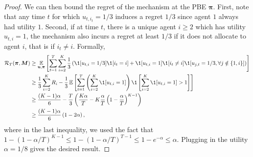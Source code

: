 \begin{proof}
    We can then bound the regret of the mechanism at the PBE $\bm\pi$. First, note that any time $t$ for which $u_{t,i_t}=1/3$ induces a regret $1/3$ since agent $1$ always had utility $1$. Second, if at time $t$, there is a unique agent $i\geq 2$ which has utility $u_{t,i}=1$, the mechanism also incurs a regret at least $1/3$ if it does not allocate to agent $i$, that is if $i_t\neq i$. Formally,
    \begin{align*}
        \mathcal R_T(\bm \pi,\bm M) &\geq \E_{\bm u,\bm\pi}\sqb{\sum_{t=1}^T \sum_{i=2}^K\frac{1}{3}\paren{\1[u_{t,i}=1/3]\1[i_t=i]  + \1[u_{t,i}=1]\1[i_t\neq i]\1[u_{j,t}=1/3,\forall j\notin\{1,i\}]} }\\
        &\geq \frac{1}{3}\sum_{i=2}^K R_i - \frac{1}{3}\E\sqb{\sum_{t=1}^T \paren{\sum_{i=2}^K\1[u_{t,i}=1]}\1\sqb{\sum_{i=2}^K\1[u_{t,i}=1] >1}}\\
        &\geq \frac{(K-1)\alpha}{6} - \frac{T}{3}\paren{\frac{K\alpha}{T}-K\frac{\alpha}{T}\paren{1-\frac{\alpha}{T}}^{K-1}}\\
        &\geq \frac{(K-1)\alpha}{6}\paren{1-2\alpha},
    \end{align*}
    where in the last inequality, we used the fact that $1-(1-\alpha/T)^{K-1}\leq 1- (1-\alpha/T)^{T-1} \leq 1-e^{-\alpha}\leq \alpha$. Plugging in the utility $\alpha=1/8$ gives the desired result.
\end{proof}

